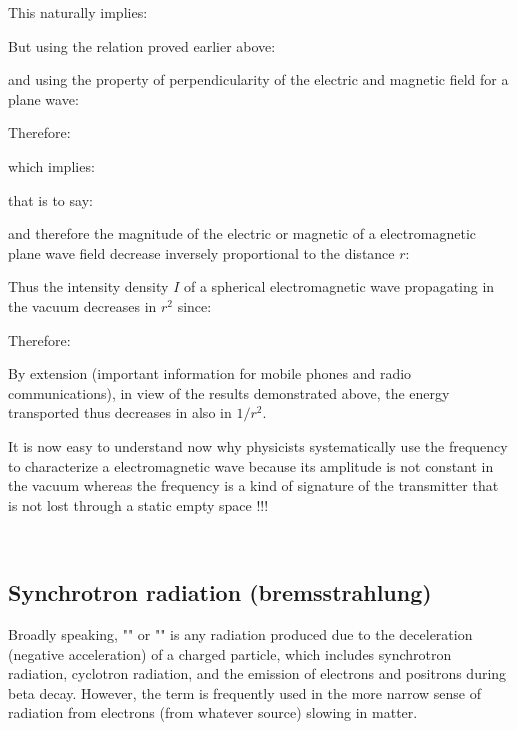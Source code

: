 	This naturally implies:
	
	But using the relation proved earlier above:
	
	and using the property of perpendicularity of the electric and magnetic field for a plane wave:
	
	Therefore:
	
	which implies:
	
	that is to say:
	
	and therefore the magnitude of the electric or magnetic of a electromagnetic plane wave field decrease inversely proportional to the distance $r$:
	
	Thus the intensity density $I$ of a spherical electromagnetic wave propagating in the vacuum decreases in $r^2$ since:
	
	Therefore:
	
	By extension (important information for mobile phones and radio communications), in view of the results demonstrated above, the energy transported thus decreases in also in $1/r^2$.
	
	It is now easy to understand now why physicists systematically use the frequency to characterize a electromagnetic wave because its amplitude is not constant in the vacuum whereas the frequency is a kind of signature of the transmitter that is not lost through a static empty space !!!
	
	\pagebreak
\	\subsection{Synchrotron radiation (bremsstrahlung)}
	Broadly speaking, "" or "" is any radiation produced due to the deceleration (negative acceleration) of a charged particle, which includes synchrotron radiation, cyclotron radiation, and the emission of electrons and positrons during beta decay. However, the term is frequently used in the more narrow sense of radiation from electrons (from whatever source) slowing in matter.
	
